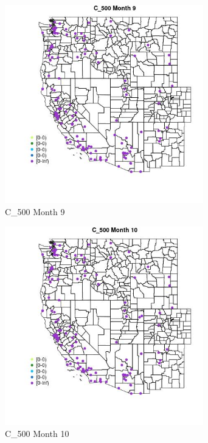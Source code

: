 \begin{figure} 
\centering  
\includegraphics[width=0.77\textwidth]{Code_Outputs/Report_ML_input_PM25_Step4_part_e_de_duplicated_aves_MapObsMo9C_500.jpg} 
\caption{\label{fig:Report_ML_input_PM25_Step4_part_e_de_duplicated_avesMapObsMo9C_500}C_500 Month 9} 
\end{figure} 
 

\begin{figure} 
\centering  
\includegraphics[width=0.77\textwidth]{Code_Outputs/Report_ML_input_PM25_Step4_part_e_de_duplicated_aves_MapObsMo10C_500.jpg} 
\caption{\label{fig:Report_ML_input_PM25_Step4_part_e_de_duplicated_avesMapObsMo10C_500}C_500 Month 10} 
\end{figure} 
 


